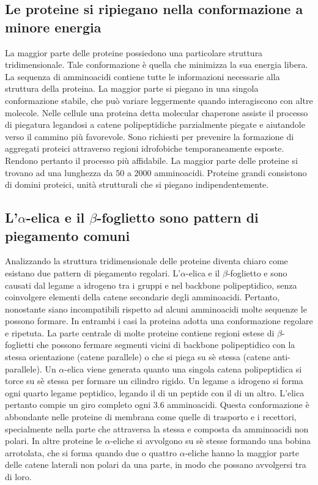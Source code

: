 \subsection{Le proteine si ripiegano nella conformazione a minore energia}
La maggior parte delle proteine possiedono una particolare struttura tridimensionale. Tale conformazione \`e quella che minimizza la sua energia libera. 
La sequenza di amminoacidi contiene tutte le informazioni necessarie alla struttura della proteina. La maggior parte si piegano in una singola 
conformazione stabile, che pu\`o variare leggermente quando interagiscono con altre molecole. Nelle cellule una proteina detta molecular chaperone assiste
il processo di piegatura legandosi a catene polipeptidiche parzialmente piegate e aiutandole verso il cammino pi\`u favorevole. Sono richiesti per 
prevenire la formazione di aggregati proteici attraverso regioni idrofobiche temporaneamente esposte. Rendono pertanto il processo pi\`u affidabile. La
maggior parte delle proteine si trovano ad una lunghezza da $50$ a $2000$ amminoacidi. Proteine grandi consistono di domini proteici, unit\`a strutturali 
che si piegano indipendentemente. 
\subsection{L'$\alpha$-elica e il $\beta$-foglietto sono pattern di piegamento comuni}
Analizzando la struttura tridimensionale delle proteine diventa chiaro come esistano due pattern di piegamento regolari. L'$\alpha$-elica e il 
$\beta$-foglietto e sono causati dal legame a idrogeno tra i gruppi  e  nel backbone polipeptidico, senza coinvolgere elementi della 
catene secondarie degli amminoacidi. Pertanto, nonostante siano incompatibili rispetto ad alcuni amminoacidi molte sequenze le possono formare. In 
entrambi i casi la proteina adotta una conformazione regolare e ripetuta. La parte centrale di molte proteine contiene regioni estese di 
$\beta$-foglietti che possono fermare segmenti vicini di backbone polipeptidico con la stessa orientazione (catene parallele) o che si piega su s\`e 
stessa (catene anti-parallele). Un $\alpha$-elica viene generata quanto una singola catena polipeptidica si torce su s\`e stessa per formare un cilindro
rigido. Un legame a idrogeno si forma ogni quarto legame peptidico, legando il  di un peptide con il  di un altro. L'elica pertanto
compie un giro completo ogni $3.6$ amminoacidi. Questa conformazione \`e abbondante nelle proteine di membrana come quelle di trasporto e i recettori, 
specialmente nella parte che attraversa la stessa e composta da amminoacidi non polari. In altre proteine le $\alpha$-eliche si avvolgono su s\`e stesse
formando una bobina arrotolata, che si forma quando due o quattro $\alpha$-eliche hanno la maggior parte delle catene laterali non polari da una parte, in
modo che possano avvolgersi tra di loro. 
